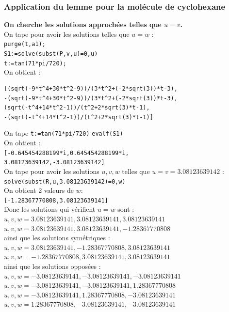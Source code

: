 \documentclass[a4paper,11pt]{book}
\begin{document}
\subsubsection{Application du lemme pour la mol\'ecule de cyclohexane}
{\bf On cherche les solutions approch\'ees telles que $u=v$.}\\
On tape pour avoir les solutions telles que $u=w$ :\\
{\tt purge(t,a1);}\\
{\tt S1:=solve(subst(P,v,u)=0,u)}\\
{\tt t:=tan(71*pi/720);}\\
On obtient :
\begin{verbatim}
[(sqrt(-9*t^4+30*t^2-9))/(3*t^2+(-2*sqrt(3))*t-3),
-(sqrt(-9*t^4+30*t^2-9))/(3*t^2+(-2*sqrt(3))*t-3),
(sqrt(-t^4+14*t^2-1))/(t^2+2*sqrt(3)*t-1),
-(sqrt(-t^4+14*t^2-1))/(t^2+2*sqrt(3)*t-1)]
\end{verbatim}
On tape 
{\tt  t:=tan(71*pi/720)}
{\tt  evalf(S1)}\\
On obtient :\\
{\tt [-0.645454288199*i,0.645454288199*i,}\\
{\tt 3.08123639142,-3.08123639142]}\\
On tape pour avoir les solutions $u,v,w$ telles que $u=v=3.08123639142$ :\\
{\tt solve(subst(R,u,3.08123639142)=0,w)}\\
On obtient 2 valeurs de $w$:\\
{\tt [-1.28367770808,3.08123639141]}\\
Donc les solutions qui v\'erifient $u=w$ sont :\\
$u,v,w=3.08123639141,3.08123639141,3.08123639141$\\
$u,v,w=3.08123639141,3.08123639141,-1.28367770808$\\
ainsi que les solutions sym\'etriques :\\
$u,v,w=3.08123639141,-1.28367770808,3.08123639141$\\
$u,v,w=-1.28367770808,3.08123639141,3.08123639141$\\
ainsi que les solutions oppos\'ees :\\
$u,v,w=-3.08123639141,-3.08123639141,-3.08123639141$\\
$u,v,w=-3.08123639141,-3.08123639141,1.28367770808$\\
$u,v,w=-3.08123639141,1.28367770808,-3.08123639141$\\
$u,v,w=1.28367770808,-3.08123639141,-3.08123639141$\\
\end{document}
